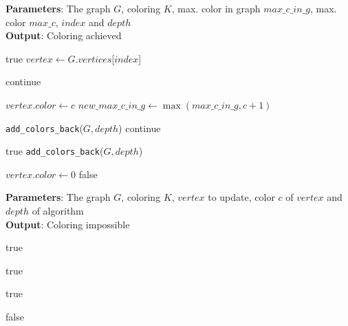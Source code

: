 \documentclass{article}
\begin{document}
\begin{algorithm}[tb]
	\caption{\texttt{can\_color\_with\_max\_c}}
	\label{alg:check}
	\textbf{Parameters}: The graph $G$, coloring $K$, max. color in graph $max\_c\_in\_g$, max. color $max\_c$, $index$ and $depth$\\
	\textbf{Output}: Coloring achieved
	\begin{algorithmic}[1]
		\RETURN true
		\ENDIF
		\STATE $vertex \gets G.vertices$[$index$]
		
		\STATE continue
		\ENDIF
		
		\STATE $vertex.color \gets c$
		\STATE $new\_max\_c\_in\_g \gets \max(max\_c\_in\_g, c + 1)$
		
		
		\STATE \texttt{add\_colors\_back}($G, depth$)
		\STATE continue
		\ENDIF
		
		\RETURN true
		\ENDIF
		\STATE \texttt{add\_colors\_back}($G, depth$)
		
		\ENDFOR
		
		\STATE $vertex.color \gets 0$
		\RETURN false
	\end{algorithmic}
\end{algorithm}

\begin{algorithm}[tb]
	\caption{\texttt{update\_neighbors}}
	\label{alg:updateN}
	\textbf{Parameters}: The graph $G$, coloring $K$, $vertex$ to update, color $c$ of $vertex$ and $depth$ of algorithm \\
	\textbf{Output}: Coloring impossible
	\begin{algorithmic}[1]
		
		
		
		\RETURN true 
		\ENDIF
		\ENDIF
		
		
		\RETURN true
		
		\RETURN true
		
		\ENDIF
		\ENDIF
		\ENDFOR
		\RETURN false
	\end{algorithmic}
\end{algorithm}
\end{document}
